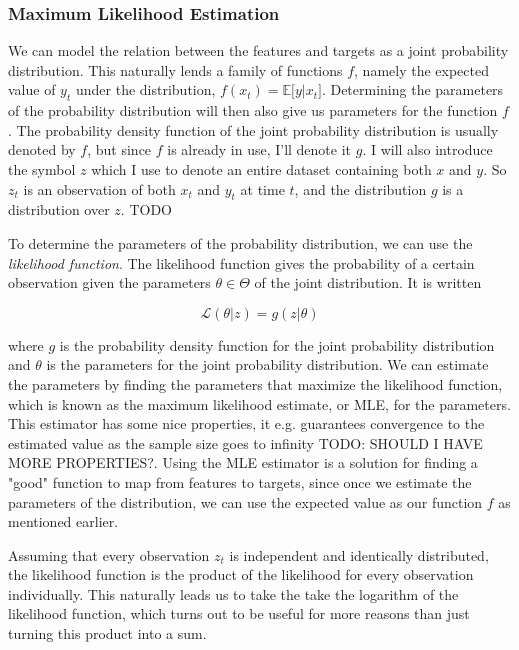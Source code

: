 \subsubsection{Maximum Likelihood Estimation}

We can model the relation between the features and targets as a joint
probability distribution.  This naturally lends a family of functions $f$,
namely the expected value of $y_t$ under the distribution, $f(x_t) = \mathbb E
\lbrack y | x_t \rbrack$. Determining the parameters of the probability
distribution will then also give us parameters for the function $f$. The
probability density function of the joint probability distribution is usually
denoted by $f$, but since $f$ is already in use, I'll denote it $g$. I will
also introduce the symbol $z$ which I use to denote an entire dataset
containing both $x$ and $y$. So $z_t$ is an observation of both $x_t$ and $y_t$
at time $t$, and the distribution $g$ is a distribution over $z$. TODO

To determine the parameters of the probability distribution, we can use the
\emph{likelihood function}. The likelihood function gives the probability of a
certain observation given the parameters $\theta \in \Theta$ of the joint
distribution. It is written

\begin{equation}
  \mathcal L(\theta | z) = g(z | \theta)
\end{equation}

where $g$ is the probability density function for the joint probability
distribution and $\theta$ is the parameters for the joint probability
distribution. We can estimate the parameters by finding the parameters that
maximize the likelihood function, which is known as the maximum likelihood
estimate, or MLE, for the parameters. This estimator has some nice properties,
it e.g. guarantees convergence to the estimated value as the sample size goes
to infinity TODO: SHOULD I HAVE MORE PROPERTIES?. Using the MLE estimator is a
solution for finding a "good" function to map from features to targets, since
once we estimate the parameters of the distribution, we can use the expected
value as our function $f$ as mentioned earlier.

Assuming that every observation $z_t$ is independent and identically
distributed, the likelihood function is the product of the likelihood for every
observation individually. This naturally leads us to take the take the
logarithm of the likelihood function, which turns out to be useful for more
reasons than just turning this product into a sum.

